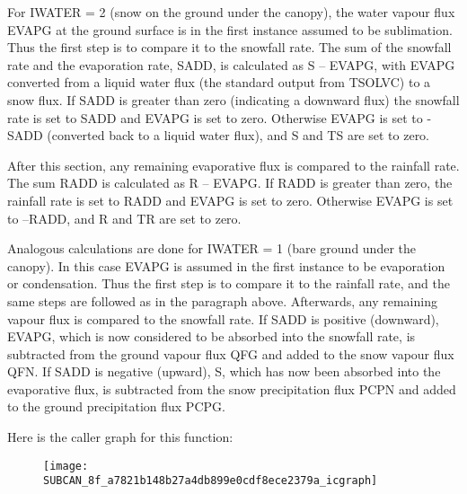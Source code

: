 For I\+W\+A\+T\+E\+R = 2 (snow on the ground under the canopy), the water vapour flux E\+V\+A\+P\+G at the ground surface is in the first instance assumed to be sublimation. Thus the first step is to compare it to the snowfall rate. The sum of the snowfall rate and the evaporation rate, S\+A\+D\+D, is calculated as S – E\+V\+A\+P\+G, with E\+V\+A\+P\+G converted from a liquid water flux (the standard output from T\+S\+O\+L\+V\+C) to a snow flux. If S\+A\+D\+D is greater than zero (indicating a downward flux) the snowfall rate is set to S\+A\+D\+D and E\+V\+A\+P\+G is set to zero. Otherwise E\+V\+A\+P\+G is set to -\/\+S\+A\+D\+D (converted back to a liquid water flux), and S and T\+S are set to zero.

After this section, any remaining evaporative flux is compared to the rainfall rate. The sum R\+A\+D\+D is calculated as R – E\+V\+A\+P\+G. If R\+A\+D\+D is greater than zero, the rainfall rate is set to R\+A\+D\+D and E\+V\+A\+P\+G is set to zero. Otherwise E\+V\+A\+P\+G is set to –\+R\+A\+D\+D, and R and T\+R are set to zero.

Analogous calculations are done for I\+W\+A\+T\+E\+R = 1 (bare ground under the canopy). In this case E\+V\+A\+P\+G is assumed in the first instance to be evaporation or condensation. Thus the first step is to compare it to the rainfall rate, and the same steps are followed as in the paragraph above. Afterwards, any remaining vapour flux is compared to the snowfall rate. If S\+A\+D\+D is positive (downward), E\+V\+A\+P\+G, which is now considered to be absorbed into the snowfall rate, is subtracted from the ground vapour flux Q\+F\+G and added to the snow vapour flux Q\+F\+N. If S\+A\+D\+D is negative (upward), S, which has now been absorbed into the evaporative flux, is subtracted from the snow precipitation flux P\+C\+P\+N and added to the ground precipitation flux P\+C\+P\+G.

Here is the caller graph for this function\+:\nopagebreak
\begin{figure}[H]
\begin{center}
\leavevmode
\texttt{[image: SUBCAN\_8f\_a7821b148b27a4db899e0cdf8ece2379a\_icgraph]}
\end{center}
\end{figure}


